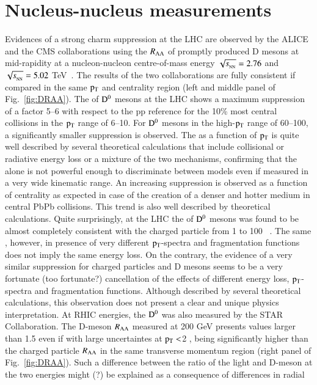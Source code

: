 \documentclass{webofc}
\begin{document}
\section{Nucleus-nucleus measurements}
\label{AAmeasurements}
Evidences of a strong charm suppression at the LHC are observed by the ALICE and the CMS collaborations using the $R_{\mathrm{AA}}$
of promptly produced D mesons at mid-rapidity at a nucleon-nucleon centre-of-mass energy $\sqrtsNN=2.76$ and $\sqrtsNN=5.02$ TeV~\cite{DAA1,DAA2,DAA3}. 
The results of the two collaborations are fully consistent if compared in the same $\rm p_{\rm T} $ and centrality region (left and middle panel of Fig.~\ref{fig:DRAA}). The \raa of $\rm D^{0}$ mesons at the LHC shows a maximum suppression of 
a factor 5--6 with respect to the pp reference for the 10\% most central collisions in the $\rm p_{\rm T} $ range of 6--10\GeVc. For $\rm D^{0}$ mesons in the high-$\rm p_{\rm T} $ range of 60--100\GeVc, a significantly smaller suppression is observed. 
The \raa as a function of $\rm p_{\rm T} $ is quite well described by several theoretical calculations that include collisional or radiative energy loss or a mixture of the two mechanisms, confirming that the 
\raa alone is not powerful enough to discriminate between models even if measured in a very wide kinematic range.
An increasing suppression is observed as a function of centrality as expected in case of the creation of a denser and hotter medium in central PbPb collisions. This trend is also 
well described by theoretical calculations. Quite surprisingly, at the LHC the \raa of $\rm D^{0}$ mesons was found to be almost 
completely consistent with the charged particle \raa from 1 to 100 \GeVc~\cite{charged}. The same \raa, however, in presence of very different $\rm p_{\rm T} $-spectra and fragmentation 
functions does not imply the same energy loss. On the contrary, the evidence of a very similar suppression for charged particles and D mesons seems to be a very fortunate (too fortunate?) cancellation of the effects
of different energy loss, $\rm p_{\rm T} $-spectra and fragmentation functions. Although described by several theoretical calculations, this observation does not present a clear and unique physics interpretation\footnotemark[\value{footnote}].
At RHIC energies, the $\rm D^{0}$ \raa was also measured by the STAR Collaboration. The D-meson $R_{\mathrm{AA}}$ measured at 200 GeV presents values larger than 1.5 even if with large uncertaintes at $\rm p_{\rm T} <$2 \GeVc, being significantly higher than 
the charged particle $R_{\mathrm{AA}}$ in the same transverse momentum region (right panel of Fig.~\ref{fig:DRAA}). Such a difference between the ratio of the light and D-meson \raa at the two energies might (?) be explained as a consequence of differences in radial 
\end{document}
